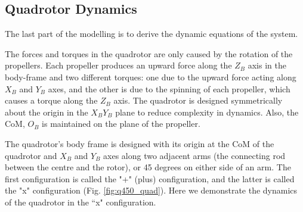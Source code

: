 

\subsection{Quadrotor Dynamics}
The last part of the modelling is to derive the dynamic equations of the system.

The forces and torques in the quadrotor are only caused by the rotation of the propellers. Each propeller produces an upward force along the $Z_B$ axis in the body-frame and two different torques: one due to the upward force acting along $X_B$ and $Y_B$ axes, and the other is due to the spinning of each propeller, which causes a torque along the $Z_B$ axis. The quadrotor is designed symmetrically about the origin in the $X_BY_B$ plane to reduce complexity in dynamics. Also, the CoM, $O_B$ is maintained on the plane of the propeller.

The quadrotor's body frame is designed with its origin at the CoM of the quadrotor and $X_B$ and $Y_B$ axes along two adjacent arms (the connecting rod between the centre and the rotor), or 45 degrees on either side of an arm. The first configuration is called the "+" (plus) configuration, and the latter is called the "x" configuration (Fig. \ref{fig:q450_quad}). Here we demonstrate the dynamics of the quadrotor in the ``x" configuration.


